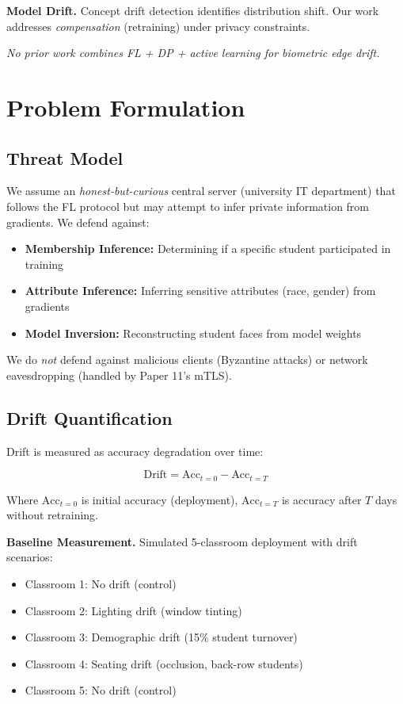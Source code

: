 \documentclass[conference]{IEEEtran}
\begin{document}
\textbf{Model Drift.} Concept drift detection \cite{gama2014} identifies distribution shift. Our work addresses \textit{compensation} (retraining) under privacy constraints.

\textit{No prior work combines FL + DP + active learning for biometric edge drift.}

\section{Problem Formulation}

\subsection{Threat Model}

We assume an \textit{honest-but-curious} central server (university IT department) that follows the FL protocol but may attempt to infer private information from gradients. We defend against:

\begin{itemize}
    \item \textbf{Membership Inference:} Determining if a specific student participated in training
    \item \textbf{Attribute Inference:} Inferring sensitive attributes (race, gender) from gradients
    \item \textbf{Model Inversion:} Reconstructing student faces from model weights
\end{itemize}

We do \textit{not} defend against malicious clients (Byzantine attacks) or network eavesdropping (handled by Paper 11's mTLS).

\subsection{Drift Quantification}

Drift is measured as accuracy degradation over time:

\begin{equation}
\text{Drift} = \text{Acc}_{t=0} - \text{Acc}_{t=T}
\end{equation}

Where $\text{Acc}_{t=0}$ is initial accuracy (deployment), $\text{Acc}_{t=T}$ is accuracy after $T$ days without retraining.

\textbf{Baseline Measurement.} Simulated 5-classroom deployment with drift scenarios:
\begin{itemize}
    \item Classroom 1: No drift (control)
    \item Classroom 2: Lighting drift (window tinting)
    \item Classroom 3: Demographic drift (15\% student turnover)
    \item Classroom 4: Seating drift (occlusion, back-row students)
    \item Classroom 5: No drift (control)
\end{itemize}
\end{document}
